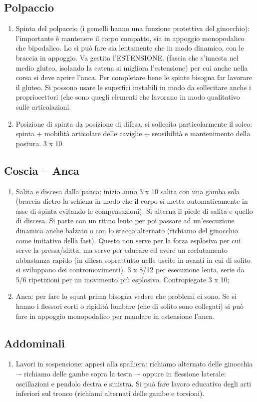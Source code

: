 \subsection{Polpaccio}
\begin{enumerate}
\item Spinta del polpaccio (i gemelli hanno una funzione protettiva del ginocchio): l'importante è
mantenere il corpo compatto, sia in appoggio monopodalico che bipodalico. Lo si può fare sia
lentamente che in modo dinamico, con le braccia in appoggio. Va gestita l'ESTENSIONE. (fascia
che s'innesta nel medio gluteo, isolando la catena si migliora l'estensione) per cui anche nella corsa
si deve aprire l'anca. Per completare bene le spinte bisogna far lavorare il gluteo. Si possono usare
le superfici instabili in modo da sollecitare anche i propriocettori (che sono quegli elementi che
lavorano in modo qualitativo sulle articolazioni
\item Posizione di spinta da posizione di difesa, si sollecita particolarmente il soleo: spinta + mobilità
articolare delle caviglie + sensibilità e mantenimento della postura. 3 x 10.
\end{enumerate}
\subsection{Coscia -- Anca}
\begin{enumerate}
\item Salita e discesa dalla panca: inizio anno 3 x 10 salita con una gamba sola (braccia dietro la schiena in
modo che il corpo si metta automaticamente in asse di spinta evitando le compensazioni). Si
alterna il piede di salita e quello di discesa. Si parte con un ritmo lento per poi passare ad
un'esecuzione dinamica anche balzato o con lo stacco alternato (richiamo del ginocchio come
imitativo della fast). Questo non serve per la forza esplosiva per cui serve la pressa/slitta, ma serve
per educare ed avere un reclutamento abbastanza rapido (in difesa soprattutto nelle uscite in
avanti in cui di solito si sviluppano dei contromovimenti). 3 x 8/12 per esecuzione lenta, serie da
5/6 ripetizioni per un movimento più esplosivo. Contropiegate 3 x 10;
\item Anca: per fare lo squat prima bisogna vedere che problemi ci sono. Se si hanno i flessori corti o
rigidità lombare (che di solito sono collegati) si può fare in appoggio monopodalico per mandare in
estensione l'anca.
\end{enumerate}
\subsection{Addominali}
\begin{enumerate}
\item Lavori in sospensione: appesi alla spalliera: richiamo alternato delle ginocchia –- richiamo delle
gambe sopra la testa –- oppure in flessione laterale: oscillazioni e pendolo destra e sinistra. Si può
fare lavoro educativo degli arti inferiori sul tronco (richiami alternati delle gambe e torsioni).
\end{enumerate}
